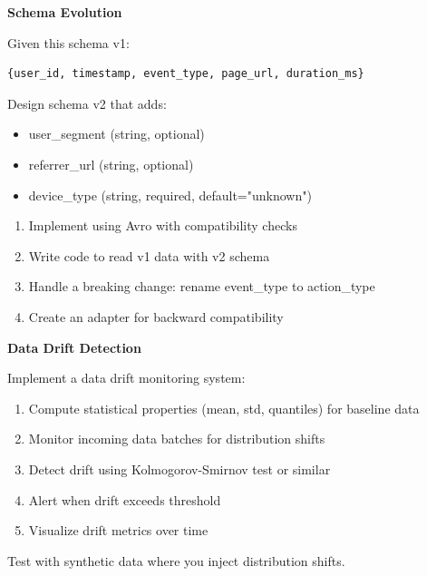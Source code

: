 \begin{exercise}
\textbf{Schema Evolution}

Given this schema v1:
\begin{verbatim}
{user_id, timestamp, event_type, page_url, duration_ms}
\end{verbatim}

Design schema v2 that adds:
\begin{itemize}
    \item user\_segment (string, optional)
    \item referrer\_url (string, optional)
    \item device\_type (string, required, default="unknown")
\end{itemize}

\begin{enumerate}
    \item Implement using Avro with compatibility checks
    \item Write code to read v1 data with v2 schema
    \item Handle a breaking change: rename event\_type to action\_type
    \item Create an adapter for backward compatibility
\end{enumerate}
\end{exercise}

\begin{exercise}
\textbf{Data Drift Detection}

Implement a data drift monitoring system:
\begin{enumerate}
    \item Compute statistical properties (mean, std, quantiles) for baseline data
    \item Monitor incoming data batches for distribution shifts
    \item Detect drift using Kolmogorov-Smirnov test or similar
    \item Alert when drift exceeds threshold
    \item Visualize drift metrics over time
\end{enumerate}

Test with synthetic data where you inject distribution shifts.
\end{exercise}

